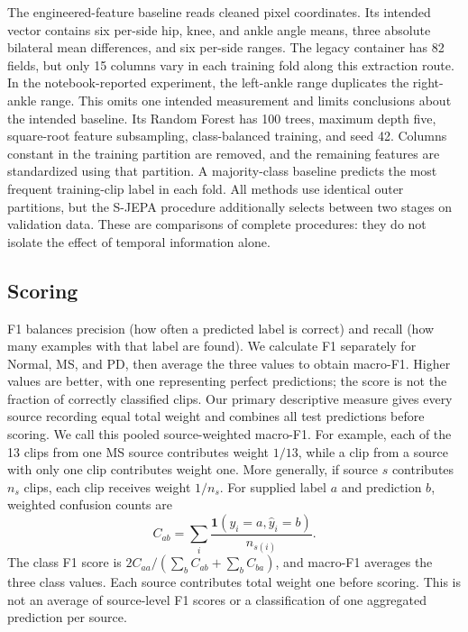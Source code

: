 \documentclass[10pt,twocolumn,letterpaper]{article}
\begin{document}
The engineered-feature baseline reads cleaned pixel coordinates. Its intended vector contains six per-side hip, knee, and ankle angle means, three absolute bilateral mean differences, and six per-side ranges. The legacy container has 82 fields, but only 15 columns vary in each training fold along this extraction route. In the notebook-reported experiment, the left-ankle range duplicates the right-ankle range. This omits one intended measurement and limits conclusions about the intended baseline. Its Random Forest has 100 trees, maximum depth five, square-root feature subsampling, class-balanced training, and seed 42. Columns constant in the training partition are removed, and the remaining features are standardized using that partition. A majority-class baseline predicts the most frequent training-clip label in each fold. All methods use identical outer partitions, but the S-JEPA procedure additionally selects between two stages on validation data. These are comparisons of complete procedures: they do not isolate the effect of temporal information alone.

\subsection{Scoring}
F1 balances precision (how often a predicted label is correct) and recall (how many examples with that label are found). We calculate F1 separately for Normal, MS, and PD, then average the three values to obtain macro-F1. Higher values are better, with one representing perfect predictions; the score is not the fraction of correctly classified clips. Our primary descriptive measure gives every source recording equal total weight and combines all test predictions before scoring. We call this pooled source-weighted macro-F1. For example, each of the 13 clips from one MS source contributes weight $1/13$, while a clip from a source with only one clip contributes weight one. More generally, if source $s$ contributes $n_s$ clips, each clip receives weight $1/n_s$. For supplied label $a$ and prediction $b$, weighted confusion counts are
\begin{equation}
C_{ab}=\sum_i \frac{\mathbf{1}(y_i=a,\widehat{y}_i=b)}{n_{s(i)}}.
\end{equation}
The class F1 score is $2C_{aa}/(\sum_b C_{ab}+\sum_b C_{ba})$, and macro-F1 averages the three class values. Each source contributes total weight one before scoring. This is not an average of source-level F1 scores or a classification of one aggregated prediction per source.
\end{document}
